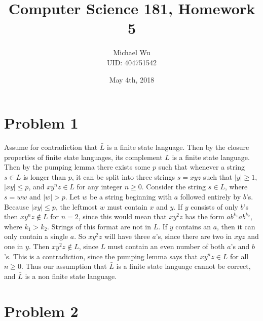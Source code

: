 \documentclass[12pt]{article}
\begin{document}
\title{Computer Science 181, Homework 5}
\date{May 4th, 2018}
\author{Michael Wu\\UID: 404751542}
\maketitle

\section*{Problem 1}

Assume for contradiction that \(\bar{L}\) is a finite state language. Then by the closure properties of finite state languages,
its complement \(L\) is a finite state language. Then by the pumping lemma there exists some \(p\) such that whenever a string \(s\in L\)
is longer than \(p\), it can be split into three strings \(s=xyz\) such that \(|y|\geq 1\), \(|xy|\leq p\), and \(xy^nz\in L\) for any integer \(n\geq 0\).
Consider the string \(s\in L\), where \(s=ww\) and \(|w|>p\). Let \(w\) be a string beginning with \(a\) followed entirely by \(b\)'s.
Because \(|xy|\leq p\), the leftmost \(w\) must contain \(x\) and \(y\). If \(y\) consists of only \(b\)'s then \(xy^nz\notin L\) for \(n=2\),
since this would mean that \(xy^2z\) has the form \(ab^{k_1}ab^{k_2}\), where \(k_1>k_2\). Strings of this format are not in \(L\). If \(y\) contains an \(a\), then
it can only contain a single \(a\). So \(xy^2z\) will have three \(a\)'s, since there are two in \(xyz\) and one in \(y\). Then \(xy^2z\notin L\), since \(L\) must
contain an even number of both \(a\)'s and \(b\)'s. This is a contradiction, since the pumping lemma says that \(xy^nz\in L\) for all \(n\geq 0\). Thus our assumption
that \(\bar{L}\) is a finite state language cannot be correct, and \(\bar{L}\) is a non finite state language.

\section*{Problem 2}
\end{document}
